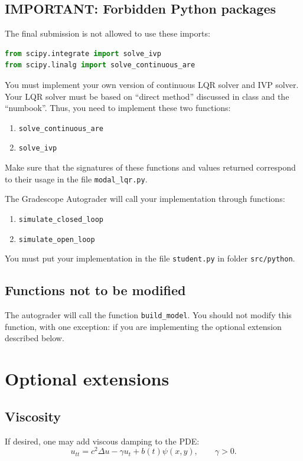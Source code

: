 \documentclass[11pt]{article}
\begin{document}
\subsection{IMPORTANT: Forbidden Python packages} 
The final submission is not allowed to use these imports:
\begin{lstlisting}[language=Python]
from scipy.integrate import solve_ivp
from scipy.linalg import solve_continuous_are
\end{lstlisting}

You must implement your own version of continuous LQR solver and
IVP solver. Your LQR solver must be based on ``direct method''
discussed in class and the ``numbook''. Thus, you need to implement these
two functions:

\begin{enumerate}
\item \texttt{solve\_continuous\_are}
\item \texttt{solve\_ivp}
\end{enumerate}

Make sure that the signatures of these functions and values returned
correspond to their usage in the file \texttt{modal\_lqr.py}.

The Gradescope Autograder will call your implementation
through functions:

\begin{enumerate}
  \item \texttt{simulate\_closed\_loop}
  \item \texttt{simulate\_open\_loop}
\end{enumerate}

You must put your implementation in the file
\texttt{student.py} in folder \texttt{src/python}.

\subsection{Functions not to be modified}
The autograder will call the function \texttt{build\_model}.
You should not modify this function, with one exception: if
you are implementing the optional extension described below.


\section*{Optional extensions}
\subsection{Viscosity}
If desired, one may add viscous damping to the PDE:
\[u_{tt}=c^2\Delta u - \gamma u_t + b(t)\psi(x,y),\qquad \gamma>0.\]
\end{document}
